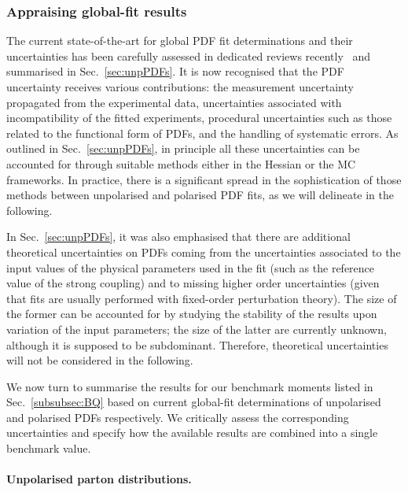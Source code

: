 \subsubsection{Appraising global-fit results}
\label{subsubsec:GPDFfits}

The current state-of-the-art for global PDF fit determinations and their 
uncertainties has been carefully assessed in dedicated reviews
recently~\cite{Forte:2013wc,Jimenez-Delgado:2013sma} and summarised in
Sec.~\ref{sec:unpPDFs}. 
%
It is now recognised that the PDF uncertainty receives various contributions: 
the measurement uncertainty propagated from the
experimental data, uncertainties associated with incompatibility of the 
fitted experiments, procedural uncertainties such as those related to the
functional form of PDFs, and the handling of systematic errors.
%
As outlined in Sec.~\ref{sec:unpPDFs}, in principle all these uncertainties 
can be accounted for through suitable methods either in the Hessian or the 
MC frameworks.
%
In practice, there is a significant spread in the sophistication 
of those methods between unpolarised and polarised PDF fits, as we will 
delineate in the following.

In Sec.~\ref{sec:unpPDFs}, it was also emphasised that there are additional 
theoretical uncertainties on PDFs coming from the uncertainties associated to 
the input values of the physical parameters used in the fit (such as the 
reference value of the strong coupling) and to missing higher order
uncertainties (given that fits are usually performed with fixed-order
perturbation theory).
%
The size of the former can be accounted for by studying the stability of the 
results upon variation of the input parameters; the size of the latter are 
currently unknown, although it is supposed to be subdominant.
%
Therefore, theoretical uncertainties will not be considered in the following.

We now turn to summarise the results for our benchmark moments listed in 
Sec.~\ref{subsubsec:BQ} based on current global-fit determinations of
unpolarised and polarised PDFs respectively.
%
We critically assess the corresponding uncertainties and specify how the
available results are combined into a single benchmark value.

\paragraph{Unpolarised parton distributions.}

